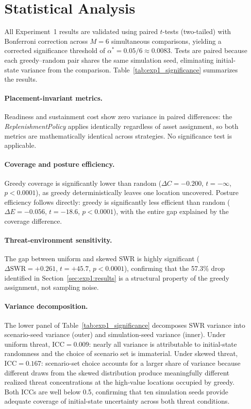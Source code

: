 \documentclass[11pt]{article}
\begin{document}
\section{Statistical Analysis}
\label{sec:stats}

All Experiment~1 results are validated using paired $t$-tests (two-tailed)
with Bonferroni correction across $M = 6$ simultaneous comparisons,
yielding a corrected significance threshold of
$\alpha^* = 0.05 / 6 \approx 0.0083$.
Tests are paired because each greedy--random pair shares the same simulation
seed, eliminating initial-state variance from the comparison.
Table~\ref{tab:exp1_significance} summarizes the results.

\paragraph{Placement-invariant metrics.}
Readiness and sustainment cost show zero variance in paired differences:
the \emph{ReplenishmentPolicy} applies identically regardless of asset
assignment, so both metrics are mathematically identical across strategies.
No significance test is applicable.

\paragraph{Coverage and posture efficiency.}
Greedy coverage is significantly lower than random
($\Delta C = -0.200$, $t = -\infty$, $p < 0.0001$),
as greedy deterministically leaves one location uncovered.
Posture efficiency follows directly: greedy is significantly less efficient
than random ($\Delta E = -0.056$, $t = -18.6$, $p < 0.0001$),
with the entire gap explained by the coverage difference.

\paragraph{Threat-environment sensitivity.}
The gap between uniform and skewed SWR is highly significant
($\Delta\mathrm{SWR} = +0.261$, $t = +45.7$, $p < 0.0001$),
confirming that the 57.3\% drop identified in
Section~\ref{sec:exp1:results} is a structural property of the
greedy assignment, not sampling noise.

\paragraph{Variance decomposition.}
The lower panel of Table~\ref{tab:exp1_significance} decomposes SWR
variance into scenario-seed variance (outer) and simulation-seed variance
(inner). Under uniform threat, $\mathrm{ICC} = 0.009$: nearly all
variance is attributable to initial-state randomness and the choice of
scenario set is immaterial. Under skewed threat, $\mathrm{ICC} = 0.167$:
scenario-set choice accounts for a larger share of variance because
different draws from the skewed distribution produce meaningfully
different realized threat concentrations at the high-value locations
occupied by greedy. Both ICCs are well below 0.5, confirming that
ten simulation seeds provide adequate coverage of initial-state
uncertainty across both threat conditions.





\newpage


\end{document}
